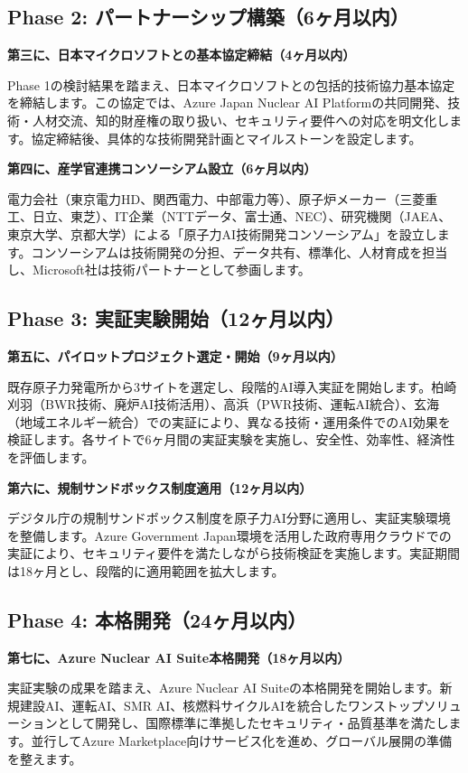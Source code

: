 \documentclass[10pt,a4paper]{jsarticle}
\begin{document}
\subsection{Phase 2: パートナーシップ構築（6ヶ月以内）}

\textbf{第三に、日本マイクロソフトとの基本協定締結（4ヶ月以内）}

Phase 1の検討結果を踏まえ、日本マイクロソフトとの包括的技術協力基本協定を締結します。この協定では、Azure Japan Nuclear AI Platformの共同開発、技術・人材交流、知的財産権の取り扱い、セキュリティ要件への対応を明文化します。協定締結後、具体的な技術開発計画とマイルストーンを設定します。

\textbf{第四に、産学官連携コンソーシアム設立（6ヶ月以内）}

電力会社（東京電力HD、関西電力、中部電力等）、原子炉メーカー（三菱重工、日立、東芝）、IT企業（NTTデータ、富士通、NEC）、研究機関（JAEA、東京大学、京都大学）による「原子力AI技術開発コンソーシアム」を設立します。コンソーシアムは技術開発の分担、データ共有、標準化、人材育成を担当し、Microsoft社は技術パートナーとして参画します。

\subsection{Phase 3: 実証実験開始（12ヶ月以内）}

\textbf{第五に、パイロットプロジェクト選定・開始（9ヶ月以内）}

既存原子力発電所から3サイトを選定し、段階的AI導入実証を開始します。柏崎刈羽（BWR技術、廃炉AI技術活用）、高浜（PWR技術、運転AI統合）、玄海（地域エネルギー統合）での実証により、異なる技術・運用条件でのAI効果を検証します。各サイトで6ヶ月間の実証実験を実施し、安全性、効率性、経済性を評価します。

\textbf{第六に、規制サンドボックス制度適用（12ヶ月以内）}

デジタル庁の規制サンドボックス制度を原子力AI分野に適用し、実証実験環境を整備します。Azure Government Japan環境を活用した政府専用クラウドでの実証により、セキュリティ要件を満たしながら技術検証を実施します。実証期間は18ヶ月とし、段階的に適用範囲を拡大します。

\subsection{Phase 4: 本格開発（24ヶ月以内）}

\textbf{第七に、Azure Nuclear AI Suite本格開発（18ヶ月以内）}

実証実験の成果を踏まえ、Azure Nuclear AI Suiteの本格開発を開始します。新規建設AI、運転AI、SMR AI、核燃料サイクルAIを統合したワンストップソリューションとして開発し、国際標準に準拠したセキュリティ・品質基準を満たします。並行してAzure Marketplace向けサービス化を進め、グローバル展開の準備を整えます。
\end{document}
